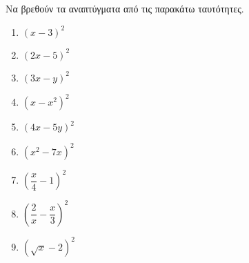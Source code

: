 Να βρεθούν τα αναπτύγματα από τις παρακάτω ταυτότητες.
\begin{multicols}{3}
\begin{enumerate}[label=\roman*.]
\item $ \left(x-3 \right)^2 $
\item $ \left(2x-5 \right)^2 $
\item $ \left(3x-y \right)^2 $
\item $ \left(x-x^2 \right)^2 $
\item $ \left(4x-5y \right)^2 $
\item $ \left(x^2-7x \right)^2 $
\item $ \left(\dfrac{x}{4}-1 \right)^2 $
\item $ \left(\dfrac{2}{x}-\dfrac{x}{3} \right)^2 $
\item $ \left(\sqrt{x}-2 \right)^2 $
\end{enumerate}
\end{multicols}

